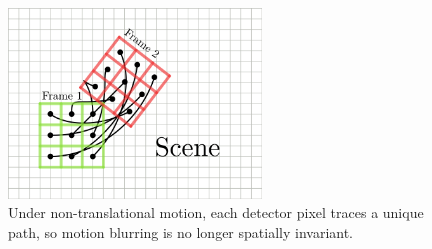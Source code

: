 \documentclass[tocnosub,noragright,centerchapter,12pt]{uiucecethesis09}
\begin{document}

\begin{figure}
  \centering
  \includegraphics[width=0.6\textwidth]{figures/effective_problem2.png}
  \caption{Under non-translational motion, each detector pixel traces a unique path, so motion blurring is no longer spatially invariant.}
  \label{fig:effective_problem2}
\end{figure}
\end{document}
